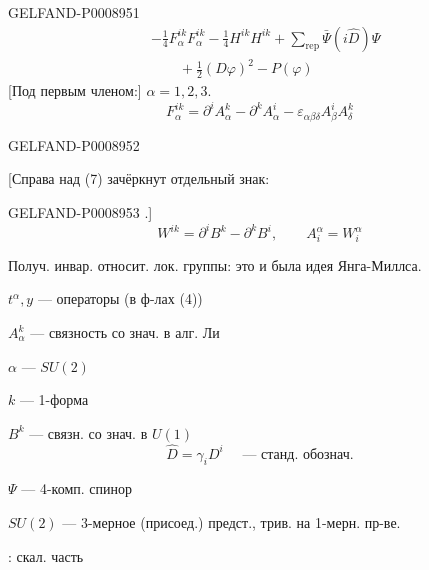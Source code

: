 \begin{GelfandAdjacentEvidence}{GELFAND-P000895}{1}
\begin{equation*}
\begin{aligned}
&-\frac14F_\alpha^{ik}F_\alpha^{ik}-\frac14H^{ik}H^{ik}
+\sum_{\mathrm{rep}}\bar\Psi(i\hat D)\Psi\\
&\qquad+\frac12(D\varphi)^2-P(\varphi)
\end{aligned}
\tag{6}
\end{equation*}
[Под первым членом:] $\alpha=1,2,3.$
\begin{equation*}
F_\alpha^{ik}=\partial^i A_\alpha^k-\partial^k A_\alpha^i
-\varepsilon_{\alpha\beta\delta}A_\beta^i A_\delta^k
\tag{7}
\end{equation*}
\end{GelfandAdjacentEvidence}
\begin{GelfandAdjacentEvidence}{GELFAND-P000895}{2}

[Справа над (7) зачёркнут отдельный знак: 
\end{GelfandAdjacentEvidence}
\begin{GelfandAdjacentEvidence}{GELFAND-P000895}{3}
.]
\begin{equation*}
W^{ik}=\partial^i B^k-\partial^k B^i,\qquad A_i^\alpha=W_i^\alpha
\tag{8}
\end{equation*}

Получ. инвар. относит. лок. группы: это и была идея Янга-Миллса.

$t^\alpha,y$ — операторы (в ф-лах (4))

$A_\alpha^k$ — связность со знач. в алг. Ли

$\alpha$ — $SU(2)$

$k$ — 1-форма

$B^k$ — связн. со знач. в $U(1)$
\begin{equation*}
\hat D=\gamma_i D^i\quad\text{ — станд. обознач.}
\tag{9}
\end{equation*}

$\Psi$ — 4-комп. спинор

$SU(2)$ — 3-мерное (присоед.) предст., трив. на 1-мерн. пр-ве.

: скал. часть
\end{GelfandAdjacentEvidence}
